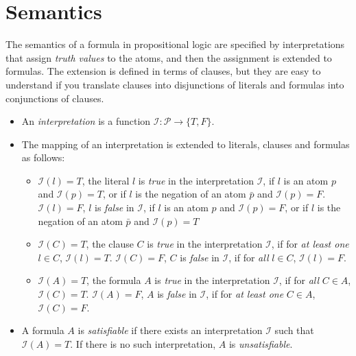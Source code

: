 \documentclass[11pt]{report}
\begin{document}

\section{Semantics}\label{s.semantics}

The semantics of a formula in propositional logic are specified by interpretations that assign \emph{truth values} to the atoms, and then the assignment is extended to formulas. The extension is defined in terms of clauses, but they are easy to understand if you translate clauses into disjunctions of literals and formulas into conjunctions of clauses.

\begin{itemize}

\item An \emph{interpretation} is a function $\mathcal{I}: \mathcal{P}
\rightarrow \{T,F\}$.

\item The mapping of an interpretation is extended to literals, clauses and formulas as follows:

\begin{itemize}
\item $\mathcal{I}(l)=T$, the literal $l$ is \emph{true} in the
interpretation $\mathcal{I}$, if $l$ is an atom $p$ and $\mathcal{I}(p)=T$, or if $l$ is the negation of an atom $\bar{p}$ and $\mathcal{I}(p)=F$. $\mathcal{I}(l)=F$, $l$ is \emph{false} in $\mathcal{I}$, if $l$ is an atom $p$ and $\mathcal{I}(p)=F$, or if $l$ is the negation of an atom $\bar{p}$ and $\mathcal{I}(p)=T$

\item $\mathcal{I}(C)=T$, the clause $C$ is \emph{true} in the
interpretation $\mathcal{I}$, if for \emph{at least one} $l\in C$,
$\mathcal{I}(l)=T$. $\mathcal{I}(C)=F$, $C$ is \emph{false} in $\mathcal{I}$, if for \emph{all} $l\in C$, $\mathcal{I}(l)=F$.

\item $\mathcal{I}(A)=T$, the formula $A$ is \emph{true} in the
interpretation $\mathcal{I}$, if for \emph{all} $C \in A$,
$\mathcal{I}(C)=T$. $\mathcal{I}(A)=F$, $A$ is \emph{false} in $\mathcal{I}$, if for \emph{at least one} $C\in A$, $\mathcal{I}(C)=F$.

\end{itemize}

\item A formula $A$ is \emph{satisfiable} if there exists an
interpretation $\mathcal{I}$ such that $\mathcal{I}(A)=T$. If there is
no such interpretation, $A$ is \emph{unsatisfiable}.


\end{itemize}
\end{document}
